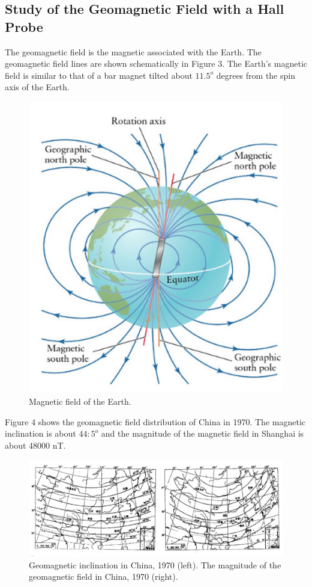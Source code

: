 \documentclass[12pt]{article}
\begin{document}
\subsection{Study of the Geomagnetic Field with a Hall Probe}
The geomagnetic field is the magnetic associated with the Earth. The geomagnetic field
lines are shown schematically in Figure 3. The Earth's magnetic field is similar to that of
a bar magnet tilted about $11.5^o$ degrees from the spin axis of the Earth.
\begin{figure}[H]
\centering
\includegraphics[scale=0.4]{P3.jpg}
\caption{Magnetic field of the Earth.}
\end{figure}
\par Figure 4 shows the geomagnetic field distribution of China in 1970. The magnetic
inclination is about $44:5^o$ and the magnitude of the magnetic field in Shanghai is about
48000 nT.
\begin{figure}[H]
\centering
\includegraphics[scale=0.4]{P4.jpg}
\caption{Geomagnetic inclination in China, 1970 (left). The magnitude of the geomagnetic field in China, 1970 (right).}
\end{figure}
\end{document}
